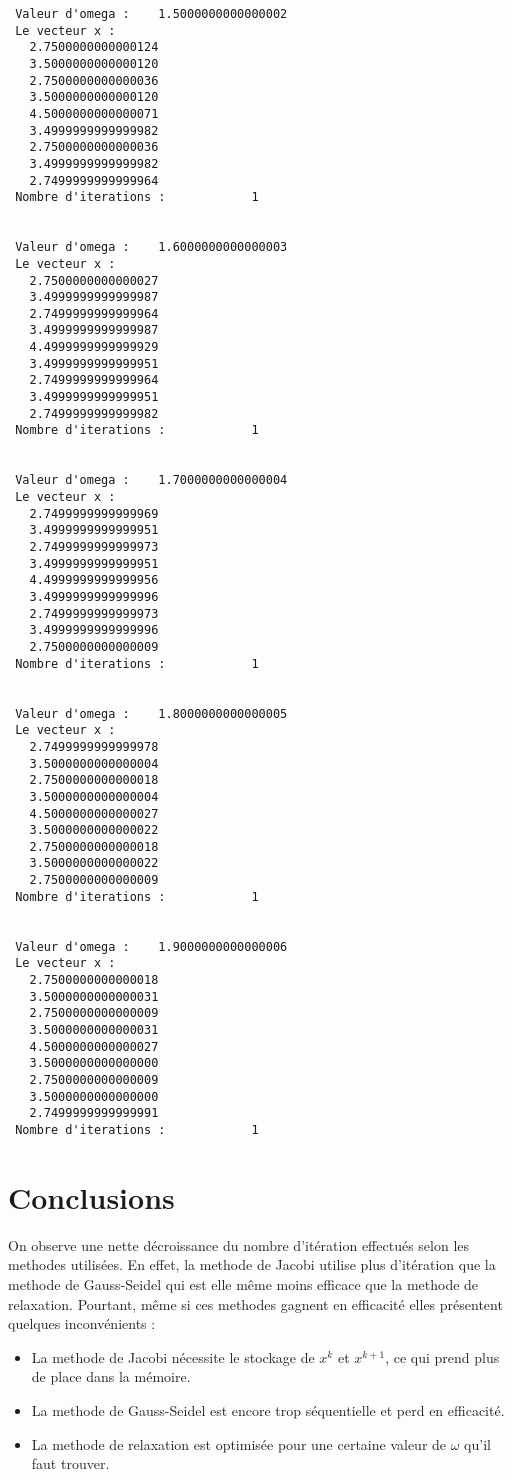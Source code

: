 \documentclass{report}
\begin{document}
\begin{small}
\begin{verbatim}
 Valeur d'omega :    1.5000000000000002     
 Le vecteur x :
   2.7500000000000124     
   3.5000000000000120     
   2.7500000000000036     
   3.5000000000000120     
   4.5000000000000071     
   3.4999999999999982     
   2.7500000000000036     
   3.4999999999999982     
   2.7499999999999964     
 Nombre d'iterations :            1


 Valeur d'omega :    1.6000000000000003     
 Le vecteur x :
   2.7500000000000027     
   3.4999999999999987     
   2.7499999999999964     
   3.4999999999999987     
   4.4999999999999929     
   3.4999999999999951     
   2.7499999999999964     
   3.4999999999999951     
   2.7499999999999982     
 Nombre d'iterations :            1


 Valeur d'omega :    1.7000000000000004     
 Le vecteur x :
   2.7499999999999969     
   3.4999999999999951     
   2.7499999999999973     
   3.4999999999999951     
   4.4999999999999956     
   3.4999999999999996     
   2.7499999999999973     
   3.4999999999999996     
   2.7500000000000009     
 Nombre d'iterations :            1


 Valeur d'omega :    1.8000000000000005     
 Le vecteur x :
   2.7499999999999978     
   3.5000000000000004     
   2.7500000000000018     
   3.5000000000000004     
   4.5000000000000027     
   3.5000000000000022     
   2.7500000000000018     
   3.5000000000000022     
   2.7500000000000009     
 Nombre d'iterations :            1


 Valeur d'omega :    1.9000000000000006     
 Le vecteur x :
   2.7500000000000018     
   3.5000000000000031     
   2.7500000000000009     
   3.5000000000000031     
   4.5000000000000027     
   3.5000000000000000     
   2.7500000000000009     
   3.5000000000000000     
   2.7499999999999991     
 Nombre d'iterations :            1
\end{verbatim}
\end{small}
\newpage
\section{Conclusions}
On observe une nette décroissance du nombre d'itération effectués selon les methodes utilisées.
En effet, la methode de Jacobi utilise plus d'itération que la methode de Gauss-Seidel qui est
elle même moins efficace que la methode de relaxation.
Pourtant, même si ces methodes gagnent en efficacité elles présentent quelques inconvénients : 
\begin{itemize}
\item La methode de Jacobi nécessite le stockage de $x^k$ et $x^{k+1}$, ce qui prend plus de place dans la mémoire.
\item La methode de Gauss-Seidel est encore trop séquentielle et perd en efficacité.
\item La methode de relaxation est optimisée pour une certaine valeur de $\omega$ qu'il faut trouver.
\end{itemize}
\end{document}
